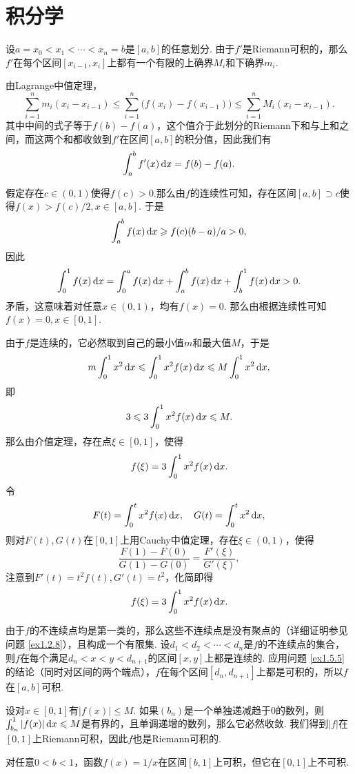 \section{积分学}
\begin{ans}
  设$a=x_0<x_1<\cdots<x_n=b$是$[a,b]$的任意划分. 由于$f'$是Riemann可积的，那么$f'$在每个区间$[x_{i-1},x_i]$上都有一个有限的上确界$M_i$和下确界$m_i$.

  由Lagrange中值定理，
  \[
    \sum_{i=1}^nm_i(x_i-x_{i-1}) \le
    \sum_{i=1}^n\big(f(x_i)-f(x_{i-1})\big) \le
    \sum_{i=1}^n M_i(x_i-x_{i-1}).
  \]
  其中中间的式子等于$f(b)-f(a)$，这个值介于此划分的Riemann下和与上和之间，而这两个和都收敛到$f'$在区间$[a,b]$的积分值，因此我们有
  \[
    \int_a^bf'(x)\,\mathrm dx = f(b)-f(a).
  \]
\end{ans}

\begin{ans}
   假定存在$c\in(0,1)$使得$f(c)>0$.那么由$f$的连续性可知，存在区间$[a,b]\supset c$使得$f(x)>f(c)/2,x\in[a,b]$. 于是
   \[
     \int_a^bf(x)\,\mathrm dx \geqslant f(c)(b-a)/a >0 ,
   \]
   因此
   \[ \int_0^1f(x)\,\mathrm dx=\int_0^a f(x)\,\mathrm dx +\int_a^bf(x)\,\mathrm dx
   +\int_b^1f(x)\,\mathrm dx>0. \]
   矛盾，这意味着对任意$x\in(0,1)$，均有$f(x)=0$. 那么由根据连续性可知$f(x)=0,x\in[0,1]$.
\end{ans}

\begin{ans}
  \method 由于$f$是连续的，它必然取到自己的最小值$m$和最大值$M$，于是
  \[
    m\int_0^1x^2\,\mathrm dx \leqslant \int_0^1 x^2 f(x)\,\mathrm dx \leqslant M\int_0^1x^2\,\mathrm dx,
  \]
  即
  \[ 3\leqslant 3\int_0^1x^2f(x)\,\mathrm dx \leqslant M. \]
  那么由介值定理，存在点$\xi\in[0,1]$，使得
  \[ f(\xi) = 3\int_0^1x^2f(x)\,\mathrm dx. \]
  \method 令
  \[ F(t) = \int_0^tx^2f(x)\,\mathrm dx ,\quad
     G(t) = \int_0^t x^2\,\mathrm dx, \]
  则对$F(t),G(t)$在$[0,1]$上用Cauchy中值定理，存在$\xi\in(0,1)$，使得
  \[
    \frac{F(1)-F(0)}{G(1)-G(0)}=\frac{F'(\xi)}{G'(\xi)},
  \]
  注意到$F'(t)=t^2f(t),G'(t)=t^2$，化简即得
  \[ f(\xi) = 3\int_0^1x^2f(x)\,\mathrm dx. \]
\end{ans}

\begin{ans}
  由于$f$的不连续点均是第一类的，那么这些不连续点是没有聚点的（详细证明参见问题 \ref{ex1.2.8}），且构成一个有限集. 设$d_1<d_2<\cdots<d_n$是$f$的不连续点的集合，则$f$在每个满足$d_n<x<y<d_{n+1}$的区间$[x,y]$上都是连续的. 应用问题 \ref{ex1.5.5} 的结论（同时对区间的两个端点），$f$在每个区间$[d_n,d_{n+1}]$上都是可积的，所以$f$在$[a,b]$可积.
\end{ans}

\begin{ans}
  \begin{enumb}
    \item 设对$x\in[0,1]$有$|f(x)|\le M$. 如果$(b_n)$是一个单独递减趋于$0$的数列，则$\int_{b_n}^1|f(x)|\,\mathrm dx \leqslant M$是有界的，且单调递增的数列，那么它必然收敛. 我们得到$|f|$在$[0,1]$上Riemann可积，因此$f$也是Riemann可积的.
    \item 对任意$0<b<1$，函数$f(x)=1/x$在区间$[b,1]$上可积，但它在$[0,1]$上不可积.
  \end{enumb}
\end{ans}

